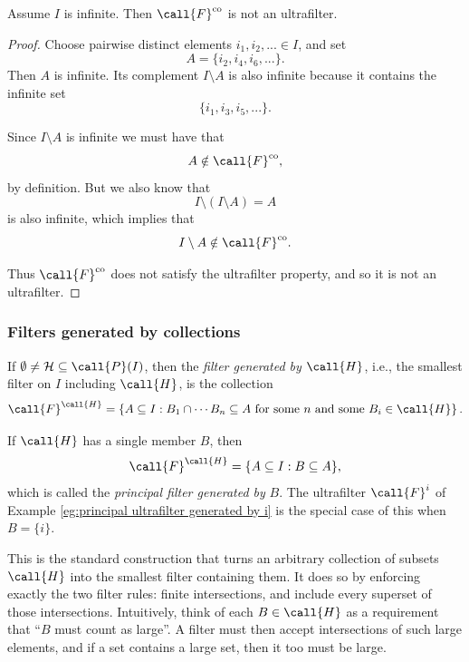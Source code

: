 {\begin{prop}
Assume \(I\) is infinite. Then \(\call{F}^{\mathrm{co}}\) is not an
ultrafilter.
\end{prop}

\begin{proof}
Choose pairwise distinct elements \(i_1, i_2,... \in I\), and set
\[
A=\{i_2, i_4,i_6,...\}.
\]
Then \(A\) is infinite. Its complement \(I \setminus A\) is also infinite
because it contains the infinite set
\[
\{i_1, i_3, i_5,...\}.
\]

Since \(I \setminus A\) is infinite we must have that
\[
A \notin \call{F}^{\mathrm{co}},
\]
by definition. But we also know that
\[
I \setminus (I \setminus A) = A
\]
is also infinite, which implies that
\[
I \setminus A \notin \call{F}^{\mathrm{co}}.
\]

Thus \(\call{F}^{\mathrm{co}}\) does not satisfy the ultrafilter property,
and so it is not an ultrafilter.
\end{proof}

\subsubsection{Filters generated by collections}

\begin{defn}
If \(\emptyset \neq \mathcal{H} \subseteq \call{P}(I)\), then the
\emph{filter generated by} \(\call{H}\), i.e., the smallest filter on \(I\)
including \(\call{H}\), is the collection
\[
\call{F}^\call{H}
=
\left\{
A \subseteq I :
B_1 \cap \cdots B_n \subseteq A
\text{ for some } n \text{ and some } B_i \in \call{H}
\right\}.
\]

If \(\call{H}\) has a single member \(B\), then
\[
\call{F}^\call{H}
=
\{ A \subseteq I : B \subseteq A \},
\]
which is called the \emph{principal filter generated by} \(B\). The
ultrafilter \(\call{F}^i\) of
Example \ref{eg:principal ultrafilter generated by i} is the special case of
this when \(B=\{i\}\).

This is the standard construction that turns an arbitrary collection of
subsets \(\call{H}\) into the smallest filter containing them. It does so by
enforcing exactly the two filter rules: finite intersections, and include
every superset of those intersections. Intuitively, think of each
\(B \in \call{H}\) as a requirement that ``\(B\) must count as large''. A
filter must then accept intersections of such large elements, and if a set
contains a large set, then it too must be large.
\end{defn}

}
